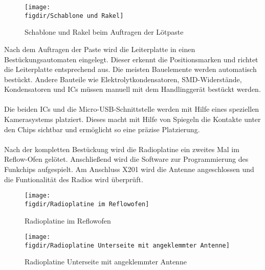 \begin{figure}[H]
    \centering
    \texttt{[image: \\figdir/Schablone und Rakel]}
    \caption{Schablone und Rakel beim Auftragen der Lötpaste}
    \label{fig:fig: Abbildung 15}
\end{figure}

\newpage
\noindent
Nach dem Auftragen der Paste wird die Leiterplatte in einen Bestückungsautomaten eingelegt.
Dieser erkennt die Positionsmarken und richtet die Leiterplatte entsprechend aus. Die meisten Bauelemente werden automatisch bestückt. Andere Bauteile wie Elektrolytkondensatoren, SMD-Widerstände, Kondensatoren und ICs müssen manuell mit dem Handlinggerät bestückt werden.\\
\\
Die beiden ICs und die Micro-USB-Schnittstelle werden mit Hilfe eines speziellen Kamerasystems platziert.
Dieses macht mit Hilfe von Spiegeln die Kontakte unter den Chips sichtbar und ermöglicht so eine präzise Platzierung.\\
\\
Nach der kompletten Bestückung wird die Radioplatine ein zweites Mal im Reflow-Ofen gelötet.
Anschließend wird die Software zur Programmierung des Funkchips aufgespielt.
Am Anschluss X201 wird die Antenne angeschlossen und die Funtionalität des Radios wird überprüft.

\begin{figure}[H]
    \centering
    \texttt{[image: \\figdir/Radioplatine im Reflowofen]}
    \caption{Radioplatine im Reflowofen}
    \label{fig:fig: Abbildung 16}
\end{figure}

\begin{figure}[H]
    \centering
    \texttt{[image: \\figdir/Radioplatine Unterseite mit angeklemmter Antenne]}
    \caption{Radioplatine Unterseite mit angeklemmter Antenne}
    \label{fig:fig: Abbildung 17}
\end{figure}


